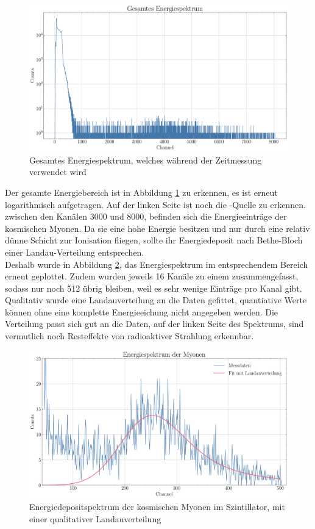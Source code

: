 \documentclass[12pt,a4paper,ngerman]{report}
\begin{document}
	\begin{figure}[ht]
		\centering
		\includegraphics[width=\textwidth]{Bilder/gesamterEnBereich.pdf}		
		\caption[Energiespektrum]{Gesamtes Energiespektrum, welches während der Zeitmessung verwendet wird}
		\label{img:gesamterEnBereich}
	\end{figure}
	Der gesamte Energiebereich ist in Abbildung \ref{img:gesamterEnBereich} zu erkennen, es ist erneut logarithmisch aufgetragen. Auf der linken Seite ist noch die -Quelle zu erkennen. zwischen den Kanälen 3000 und 8000, befinden sich die Energieeinträge der kosmischen Myonen. Da sie eine hohe Energie besitzen und nur durch eine relativ dünne Schicht zur Ionisation fliegen, sollte ihr Energiedeposit nach Bethe-Bloch einer Landau-Verteilung entsprechen.\\
	Deshalb wurde in Abbildung \ref{img:MyonenLandau}, das Energiespektrum im entsprechendem Bereich erneut geplottet. Zudem wurden jeweils 16 Kanäle zu einem zusammengefasst, sodass nur noch 512 übrig bleiben, weil es sehr wenige Einträge pro Kanal gibt. Qualitativ wurde eine Landauverteilung an die Daten gefittet, quantiative Werte können ohne eine komplette Energieeichung nicht angegeben werden. Die Verteilung passt sich gut an die Daten, auf der linken Seite des Spektrums, sind vermutlich noch Resteffekte von radioaktiver Strahlung erkennbar. 
	\begin{figure}[ht]
		\centering
		\includegraphics[width=\textwidth]{Bilder/MyonenLandau.pdf}		
		\caption[Energiedepositspektrum]{Energiedepositspektrum der kosmischen Myonen im Szintillator, mit einer qualitativer Landauverteilung}
		\label{img:MyonenLandau}
	\end{figure}
\end{document}
